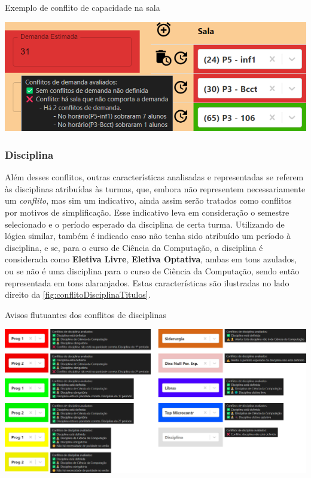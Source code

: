 \begin{MyCenteredFigure}
  \caption{Exemplo de conflito de capacidade na sala}
  \label{fig:conflitoAlocacaoSalasCapacidade}
  \includegraphics[width=\textwidth]{files/img/2.02!5-desenvolvimento/2.02!5.1.5-conflitos/Demanda X Capacidade}
\end{MyCenteredFigure}

\subsubsection{Disciplina}

Além desses conflitos, outras características analisadas e representadas se referem às disciplinas atribuídas às turmas, que, embora não representem necessariamente um \textit{conflito}, mas sim um indicativo, ainda assim serão tratados como conflitos por motivos de simplificação. Esse indicativo leva em consideração o semestre selecionado e o período esperado da disciplina de certa turma. Utilizando de lógica similar, também é indicado caso não tenha sido atribuído um período à disciplina, e se, para o curso de Ciência da Computação, a disciplina é considerada como \textbf{Eletiva Livre}, \textbf{Eletiva Optativa}, ambas em tons azulados, ou se não é uma disciplina para o curso de Ciência da Computação, sendo então representada em tons alaranjados. Estas características são ilustradas no lado direito da \autoref{fig:conflitoDisciplinaTitulos}.

\begin{MyCenteredFigure}
  \caption{Avisos flutuantes dos conflitos de disciplinas}
  \label{fig:conflitoDisciplinaTitulos}
  \includegraphics[width=\textwidth]{files/img/2.02!5-desenvolvimento/2.02!5.1.5-conflitos/Categorias Disciplinas}
\end{MyCenteredFigure}

